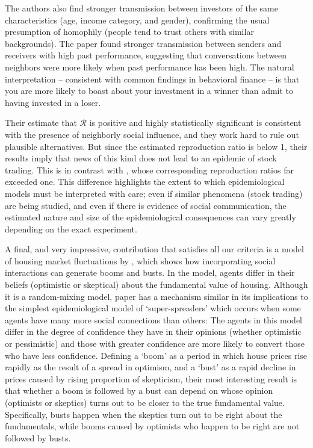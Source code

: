 The authors also find stronger transmission between investors of the same characteristics (age, income category, and gender), confirming the usual presumption of homophily (people tend to trust others with similar backgrounds). The paper found stronger transmission between senders and receivers with high past performance, suggesting that conversations between neighbors were more likely when past performance has been high.  The natural interpretation -- consistent with common findings in behavioral finance -- is that you are more likely to boast about your investment in a winner than admit to having invested in a loser.

Their estimate that $\mathcal{R}$ is positive and highly statistically significant is consistent with the presence of neighborly social influence, and they work hard to rule out plausible alternatives. But since the estimated reproduction ratio is below  1, their results imply that news of this kind does not lead to an epidemic of stock trading.  This is in contrast with \cite{shiller1989survey}, whose corresponding reproduction ratios far exceeded one.  This difference highlights the extent to which epidemiological models must be interpreted with care; even if similar phenomena (stock trading) are being studied, and even if there is evidence of social communication, the estimated nature and size of the epidemiological consequences can vary greatly depending on the exact experiment.

A final, and very impressive, contribution that satisfies all our criteria is a model of housing market fluctuations by \href{https://www.journals.uchicago.edu/doi/abs/10.1086/686732}{\cite{burnside_understanding_2016}}, which shows how incorporating social interactions can generate booms and busts. In the model, agents differ in their beliefs (optimistic or skeptical) about the fundamental value of housing.  Although it is a random-mixing model, paper has a mechanism similar in its implications to the simplest epidemiological model of `super-spreaders' which occurs when some agents have many more social connections than others:  The agents in this model differ in the degree of confidence they have in their opinions (whether optimistic or pessimistic) and those with greater confidence are more likely to convert those who have less confidence.  Defining a `boom' as a period in which house prices rise rapidly as the result of a spread in optimism, and a `bust' as a rapid decline in prices caused by rising proportion of skepticism, their most interesting result is that whether a boom is followed by a bust can depend on whose opinion (optimists or skeptics) turns out to be closer to the true fundamental value.  Specifically, busts happen when the skeptics turn out to be right about the fundamentals, while booms caused by optimists who happen to be right are not followed by busts.

